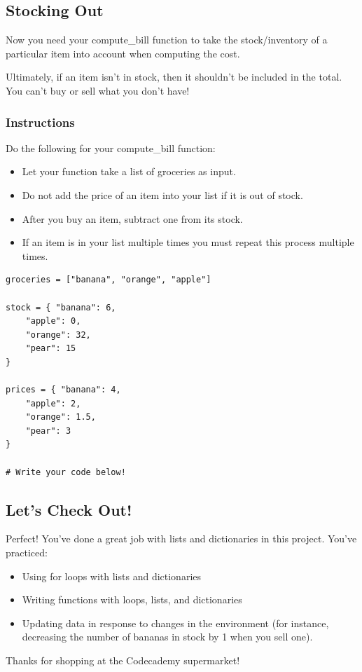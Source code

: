 \documentclass[12pt,a4paper,final,twoside,onecolumn,titlepage]{book}
\begin{document}
\subsection{Stocking Out}

Now you need your compute\_bill function to take the stock/inventory of a particular item into account when computing the cost.

Ultimately, if an item isn't in stock, then it shouldn't be included in the total. You can't buy or sell what you don't have!
\subsubsection{Instructions}

Do the following for your compute\_bill function:
\begin{itemize}
\item    Let your function take a list of groceries as input.
\item    Do not add the price of an item into your list if it is out of stock.
\item    After you buy an item, subtract one from its stock.
\item    If an item is in your list multiple times you must repeat this process multiple times.
\end{itemize}

\begin{lstlisting}
groceries = ["banana", "orange", "apple"]

stock = { "banana": 6,
    "apple": 0,
    "orange": 32,
    "pear": 15
}
    
prices = { "banana": 4,
    "apple": 2,
    "orange": 1.5,
    "pear": 3
}

# Write your code below!

\end{lstlisting}

\subsection{Let's Check Out!}

Perfect! You've done a great job with lists and dictionaries in this project. You've practiced:
\begin{itemize}
\item    Using for loops with lists and dictionaries
\item    Writing functions with loops, lists, and dictionaries
\item    Updating data in response to changes in the environment (for instance, decreasing the number of bananas in stock by 1 when you sell one).
\end{itemize}
Thanks for shopping at the Codecademy supermarket!
\end{document}
